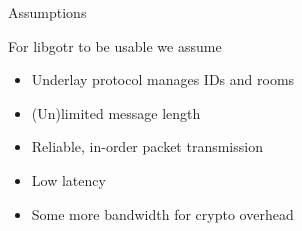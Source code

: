 \begin{frame}{Assumptions}
	\begin{block}{For libgotr to be usable we assume}
		\begin{itemize}
			\item Underlay protocol manages IDs and rooms
			\item (Un)limited message length
			\item Reliable, in-order packet transmission
			\item Low latency
			\item Some more bandwidth for crypto overhead
		\end{itemize}
	\end{block}
\end{frame}
